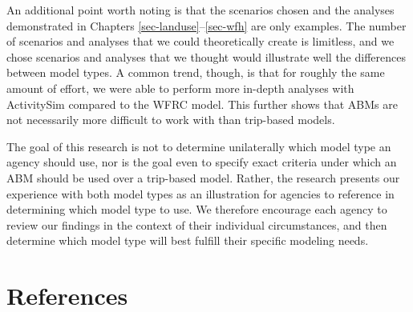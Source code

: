 \documentclass[fancy, twoside, mastersfancy, ms]{byuthesis}
\begin{document}
An additional point worth noting is that the scenarios chosen and the
analyses demonstrated in Chapters \ref{sec-landuse}--\ref{sec-wfh} are
only examples. The number of scenarios and analyses that we could
theoretically create is limitless, and we chose scenarios and analyses
that we thought would illustrate well the differences between model
types. A common trend, though, is that for roughly the same amount of
effort, we were able to perform more in-depth analyses with ActivitySim
compared to the WFRC model. This further shows that ABMs are not
necessarily more difficult to work with than trip-based models.

The goal of this research is not to determine unilaterally which model
type an agency should use, nor is the goal even to specify exact
criteria under which an ABM should be used over a trip-based model.
Rather, the research presents our experience with both model types as an
illustration for agencies to reference in determining which model type
to use. We therefore encourage each agency to review our findings in the
context of their individual circumstances, and then determine which
model type will best fulfill their specific modeling needs.


\chapter*{References}\label{references}

\end{document}
